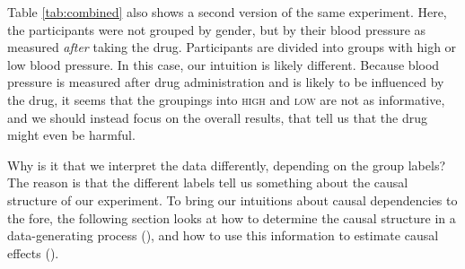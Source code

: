 \documentclass[nobib]{tufte-handout}
\begin{document}
Table \ref{tab:combined} also shows a second version of the same experiment. 
Here, the participants were not grouped by gender, but by their blood pressure as measured \textit{after} taking the drug.
Participants are divided into groups with high or low blood pressure. 
In this case, our intuition is likely different. 
Because blood pressure is measured after drug administration and is likely to be influenced by the drug, it seems that the groupings into \textsc{high} and \textsc{low} are not as informative, and we should instead focus on the overall results, that tell us that the drug might even be harmful.

Why is it that we interpret the data differently, depending on the group labels? 
The reason is that the different labels tell us something about the causal structure of our experiment.
To bring our intuitions about causal dependencies to the fore, the following section looks at 
how to determine the causal structure in a data-generating process (\textit{}), 
and how to use this information to estimate causal effects (\textit{}).
\end{document}
